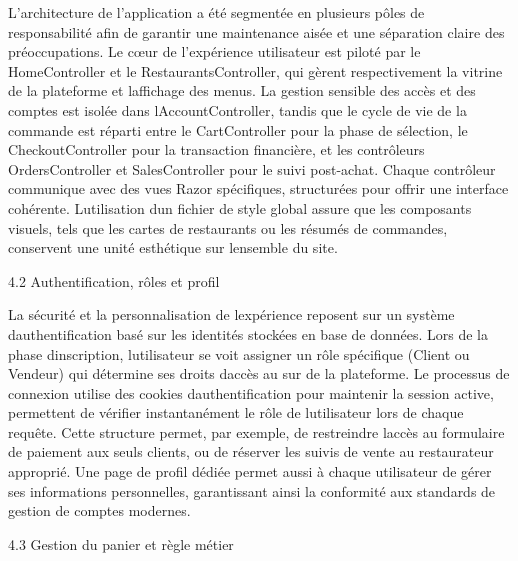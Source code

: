 \documentclass[
]{article}
\begin{document}
L'architecture de l'application a été segmentée en plusieurs pôles de
responsabilité afin de garantir une maintenance aisée et une séparation
claire des préoccupations. Le cœur de l'expérience utilisateur est
piloté par le HomeController et le RestaurantsController, qui gèrent
respectivement la vitrine de la plateforme et
l\textquotesingle affichage des menus. La gestion sensible des accès et
des comptes est isolée dans l\textquotesingle AccountController, tandis
que le cycle de vie de la commande est réparti entre le CartController
pour la phase de sélection, le CheckoutController pour la transaction
financière, et les contrôleurs OrdersController et SalesController pour
le suivi post-achat. Chaque contrôleur communique avec des vues Razor
spécifiques, structurées pour offrir une interface cohérente.
L\textquotesingle utilisation d\textquotesingle un fichier de style
global assure que les composants visuels, tels que les cartes de
restaurants ou les résumés de commandes, conservent une unité esthétique
sur l\textquotesingle ensemble du site.

4.2 Authentification, rôles et profil

La sécurité et la personnalisation de l\textquotesingle expérience
reposent sur un système d\textquotesingle authentification basé sur les
identités stockées en base de données. Lors de la phase
d\textquotesingle inscription, l\textquotesingle utilisateur se voit
assigner un rôle spécifique (Client ou Vendeur) qui détermine ses droits
d\textquotesingle accès au sur de la plateforme. Le processus de
connexion utilise des cookies d\textquotesingle authentification pour
maintenir la session active, permettent de vérifier instantanément le
rôle de l\textquotesingle utilisateur lors de chaque requête. Cette
structure permet, par exemple, de restreindre l\textquotesingle accès au
formulaire de paiement aux seuls clients, ou de réserver les suivis de
vente au restaurateur approprié. Une page de profil dédiée permet aussi
à chaque utilisateur de gérer ses informations personnelles,
garantissant ainsi la conformité aux standards de gestion de comptes
modernes.

4.3 Gestion du panier et règle métier

\subsubsection{}\label{section-7}
\end{document}
